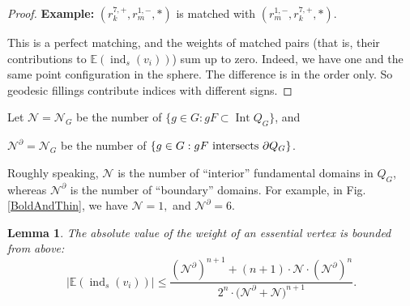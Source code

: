 \documentclass[12pt]{amsart}
\theoremstyle{plain}
\newtheorem{lemma}[theorem]{Lemma}
\theoremstyle{definition}
\theoremstyle{plain}
\theoremstyle{definition}
\renewcommand{\leq}{\leqslant}
\DeclareMathOperator{\Int}{Int}
\DeclareMathOperator{\ind}{ind}
\begin{document}
\begin{proof}
  \medskip
 \textbf{Example:} $(r_k^{7,+},r_m^{1,-},*)$ is matched with  $(r_m^{1,-},r_k^{7,+},*)$.
  
  \medskip
  
 
This is a perfect matching,  and the weights of matched pairs (that is, their contributions to
   $\mathbb{E}(\ind_s(v_i))$)
  sum up to zero. Indeed, we have one and the same point configuration in the sphere. The difference is in the order only. So geodesic fillings contribute indices  with different signs.
  
  \end{proof}
  



    Let $\mathcal{N}=\mathcal{N}_G$ be the number of $\{g\in G: gF\subset \Int Q_G\}$, and
    
 $\mathcal{N}^\partial=\mathcal{N}_G$ be the number of $\{g\in G: gF \hbox{  intersects } \partial Q_G\}$.
 
 Roughly speaking,  $\mathcal{N}$ is the number of ``interior''  fundamental domains  in $Q_G$, whereas
  $\mathcal{N}^\partial$ is the number of ``boundary'' domains.
 For example, in Fig.\ref{BoldAndThin}, we have  $\mathcal{N}=1,$ and $\mathcal{N}^\partial=6.$
 
  
 
   \begin{lemma}\label{LemmaEss}
   {The absolute value of the weight of an essential vertex is bounded from above: }
     $$|\mathbb{E}(\ind_s(v_i))|\leq \frac{(\mathcal{N}^\partial)^{n+1} +(n+1)\cdot \mathcal{N} \cdot (\mathcal{N}^\partial)^{n}}{2^n \cdot \Big(\mathcal{N}^\partial + \mathcal{N}\Big)^{n+1}}.$$
  \end{lemma}
 
\end{document}
